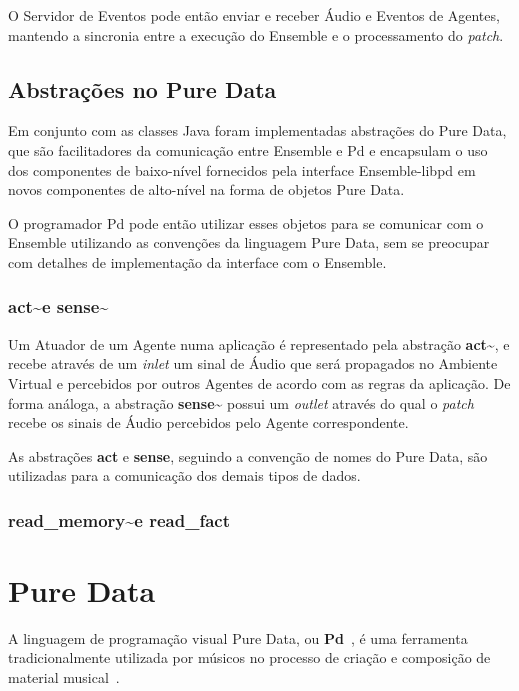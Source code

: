 \documentclass[a4paper, 11pt, twoside]{article}
\begin{document}
\begin{multicols}{2}
O Servidor de Eventos pode então enviar e receber Áudio e Eventos de Agentes,
mantendo a sincronia entre a execução do Ensemble e o processamento 
do \textit{patch}.

\subsection{Abstrações no Pure Data}

Em conjunto com as classes Java foram implementadas abstrações do
Pure Data, que são facilitadores da comunicação entre Ensemble e Pd
e encapsulam o uso dos componentes de baixo-nível fornecidos pela
interface Ensemble-libpd em  novos componentes de alto-nível
na forma de objetos Pure Data.

O programador Pd pode então utilizar esses objetos para se comunicar
com o Ensemble utilizando as convenções da linguagem Pure Data,
sem se preocupar com detalhes de implementação da interface com o
Ensemble.

\subsubsection{act\textasciitilde e sense\textasciitilde}

Um Atuador de um Agente numa aplicação é representado pela abstração
\textbf{act\textasciitilde}, e recebe através de um \textit{inlet} 
um sinal de Áudio que será propagados no Ambiente 
Virtual e percebidos por outros Agentes de acordo com as regras da aplicação. 
De forma análoga, a abstração \textbf{sense\textasciitilde} possui um 
\textit{outlet} através do qual o \textit{patch} recebe os sinais de Áudio 
percebidos pelo Agente correspondente.

As abstrações \textbf{act} e \textbf{sense}, seguindo a convenção de nomes do
Pure Data, são utilizadas para a comunicação dos demais tipos de dados.

\subsubsection{read\_memory\textasciitilde e read\_fact}



\section{Pure Data}

A linguagem de programação visual Pure Data, ou \textbf{Pd}~\cite{puckette97}, 
é uma ferramenta tradicionalmente utilizada por músicos no processo de criação
e composição de material musical~\cite{leandro11}. 


\end{multicols}
\end{document}
